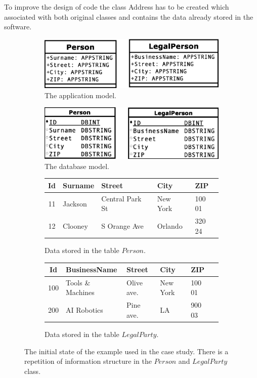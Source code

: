 \documentclass[11pt]{article}
\begin{document}
To improve the design of code the class Address has to be created which associated with both original classes and contains the data already stored in the software. 
\begin{figure}
\begin{subfigure}[b]{0.45\textwidth}
	\includegraphics[width=\textwidth]{./images/case_app_1}
	\caption{The application model.}
\end{subfigure}
\quad
\begin{subfigure}[b]{0.45\textwidth}
	\includegraphics[width=\textwidth]{./images/case_db_1}
	\caption{The database model.}
\end{subfigure}
\begin{subfigure}[b]{\textwidth}
	\centering
	\begin{tabular}{| c | l | l | l | l | }
	 	\hline
		Id &  Surname & Street & City & ZIP  \\ \hline  
		11 & Jackson & Central Park St & New York & 100 01  \\ \hline
		12 & Clooney & S Orange Ave & Orlando & 320 24  \\ \hline
	\end{tabular}
	\caption{Data stored in the table $Person$.}
\end{subfigure}
\begin{subfigure}[b]{\textwidth}
	\centering
	\begin{tabular}{| c | l | l | l | l | c |}
	 	\hline
		Id &  BusinessName & Street & City & ZIP \\ \hline  
		100 & Tools \& Machines & Olive ave. & New York & 100 01 \\ \hline
		200 & AI Robotics & Pine ave. & LA & 900 03  \\ \hline
	\end{tabular}
	\caption{Data stored in the table $LegalParty$.}
\end{subfigure}
	\caption{The initial state of the example used in the case study. There is a repetition of information structure in the $Person$ and $LegalParty$ class.}
	\label{fig:case1}
\end{figure}
\end{document}
